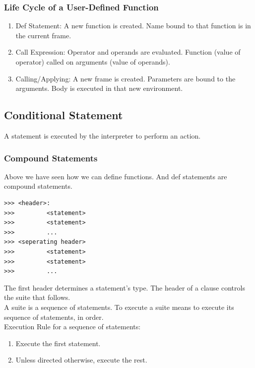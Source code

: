 \documentclass[11pt]{article}
\begin{document}
\subsubsection{Life Cycle of a User-Defined Function}
\begin{enumerate}
\item Def Statement: A new function is created. Name bound to that function is in the current frame.
\item Call Expression: Operator and operands are evaluated. Function (value of operator) called on arguments (value of operands).
\item Calling/Applying: A new frame is created. Parameters are bound to the arguments. Body is executed in that new environment.
\end{enumerate}

\subsection{Conditional Statement}
A statement is executed by the interpreter to perform an action. 
\subsubsection{Compound Statements} 
Above we have seen how we can define functions. And def statements are compound statements. 
\begin{lstlisting} 
>>> <header>: 
>>> 		<statement> 
>>> 		<statement>
>>> 		...
>>> <seperating header> 
>>> 		<statement>
>>> 		<statement>
>>> 		...
\end{lstlisting}
The first header determines a statement's type. The header of a clause controls the suite that follows. \\
A suite is a sequence of statements. To execute a suite means to execute its sequence of statements, in order. \\
Execution Rule for a sequence of statements: 
\begin{enumerate}
\item Execute the first statement.
\item Unless directed otherwise, execute the rest. 
\end{enumerate} 
\end{document}
